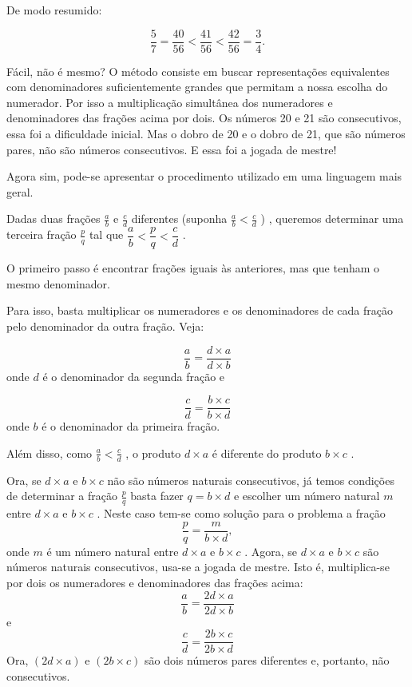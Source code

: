 \documentclass[a4,12pt]{book}
\begin{document}
\begin{refletindo*}[breakable]{}{}
  De modo resumido:  
  
  $$\dfrac{5}{7} = \dfrac{40}{56} < \dfrac{41}{56} < \dfrac{42}{56} =\dfrac{3}{4}.$$  
  
  Fácil, não é mesmo? O método consiste em buscar representações equivalentes com denominadores suficientemente grandes que permitam a nossa escolha do numerador. Por isso a multiplicação simultânea dos numeradores e denominadores das frações acima por dois. Os números 20 e 21 são consecutivos, essa foi a dificuldade inicial. Mas o dobro de 20 e o dobro de 21, que são números pares, não são números consecutivos. E essa foi a jogada de mestre!  
  
  Agora sim, pode-se apresentar o procedimento utilizado em uma linguagem mais geral.  
  
  Dadas duas frações   $\frac{a}{b}$   e   $\frac{c}{d}$   diferentes (suponha   $\frac{a}{b}<\frac{c}{d}$  ) , queremos determinar uma terceira fração   $\frac{p}{q}$   tal que   $\dfrac{a}{b}<\dfrac{p}{q}<\dfrac{c}{d}$  .  
  
  O primeiro passo é encontrar frações iguais às anteriores, mas que tenham o mesmo denominador.  
  
  Para isso, basta multiplicar os numeradores e os denominadores de cada fração pelo denominador da outra fração. Veja:  
  
  $$\dfrac{a}{b} = \dfrac{d \times a}{d \times b}$$  
  onde   $d$   é o denominador da segunda fração e  
  
  $$\dfrac{c}{d} = \dfrac{b \times c}{b \times d}$$  
  onde   $b$   é o denominador da primeira fração.  
  
  Além disso, como   $\frac{a}{b}<\frac{c}{d}$  , o produto   $d \times a$   é diferente do produto   $b \times c$  .  
  
  Ora, se   $d \times a$   e   $b \times c$   não são números naturais consecutivos, já temos condições de determinar a fração   $\frac{p}{q}$   basta fazer   $q = b \times d$   e escolher um número natural   $m$   entre   $d \times a$   e   $b \times c$  . Neste caso tem-se como solução para o problema a fração  
  $$\dfrac{p}{q} = \dfrac{m}{b \times d},$$     
  onde   $m$   é um número natural entre   $d \times a$   e   $b \times c$  .  
  Agora, se   $d \times a$   e   $b \times c$   são números naturais consecutivos, usa-se a jogada de mestre. Isto é, multiplica-se por dois os numeradores e denominadores das frações acima:  
  $$\dfrac{a}{b} = \dfrac{2d \times a}{2d \times b}$$  
  e  
  $$\dfrac{c}{d} = \dfrac{2b \times c}{2b \times d}$$  
  Ora,   $(2d \times a)$    e   $(2b \times c)$   são dois números pares diferentes e, portanto, não consecutivos.   
  

\end{refletindo*}
\end{document}
